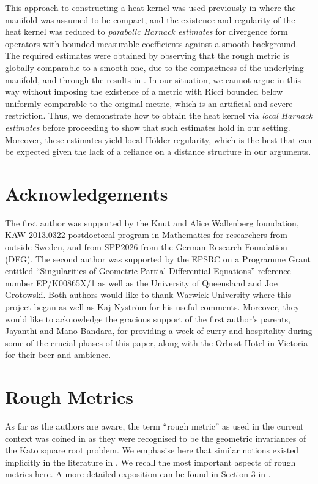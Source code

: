\documentclass[AMS,STIX1COL]{WileyNJD-v2}
\numberwithin{equation}{section}
\renewcommand{\~}{\tilde}
\renewcommand{\-}{\bar}
\newcommand{\8}{\infty}
\begin{document}
This approach to constructing a heat kernel was used previously in  
\cite{BCont} where the manifold was assumed to be compact,  and 
the existence and regularity of the heat kernel was
reduced to \emph{parabolic Harnack estimates} for divergence form operators
with bounded measurable coefficients against a smooth background. 
The required estimates
were obtained by observing that  
the rough metric is globally comparable to a smooth one,
due to the compactness of the underlying manifold, and
through the  results  in \cite{SC}.
In our situation,  we cannot argue in this way without imposing the existence of a metric with Ricci bounded below uniformly comparable to the original metric, which is an artificial and severe restriction.
Thus, we demonstrate how to obtain the heat kernel via \emph{local Harnack estimates}  before proceeding to show that such estimates  hold in our setting.
Moreover, these estimates yield local Hölder regularity, which is the best that can be expected given the lack of a reliance on a distance structure in our arguments.


\section*{Acknowledgements}

The first author was supported by the Knut and Alice Wallenberg foundation, KAW 2013.0322 
postdoctoral program in Mathematics for researchers from outside Sweden, and from  SPP2026 
from the German Research Foundation (DFG).
The second author was 
supported by the  EPSRC on a Programme Grant entitled ``Singularities of Geometric Partial Differential Equations'' 
reference number EP/K00865X/1 as well as the University of Queensland and Joe Grotowski.
Both authors would like to thank Warwick University where this project began as
well as Kaj Nyström for his useful comments.
Moreover, they would like to acknowledge the gracious support of the first author's 
parents, Jayanthi and Mano Bandara, for providing a week of curry and hospitality during some of the crucial 
phases of this paper, along with the Orbost Hotel in Victoria for their beer and ambience. 

\section{Rough Metrics}
\label{sec:rough_metrics}

As far as the authors are aware, the term ``rough metric'' as used in the current context 
was coined in \cite{BRough} as they were 
recognised to be the geometric invariances of the Kato square root problem.
We emphasise here that similar notions existed implicitly in the 
literature  in \cite{Norris,SC}.
We recall the most important aspects of rough metrics here. 
A more detailed exposition can be found in Section 3 in \cite{BRough}.
\end{document}
